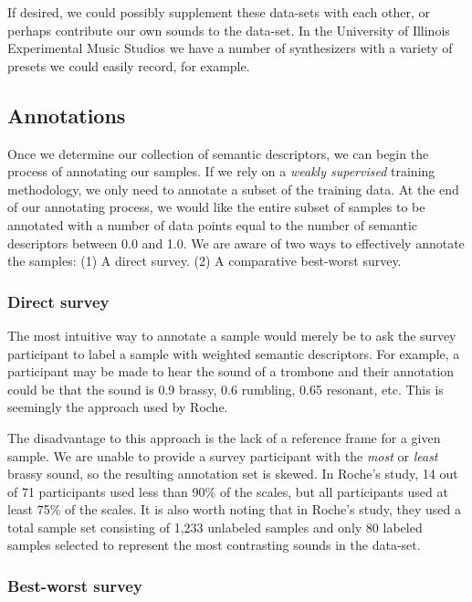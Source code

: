 \documentclass{article}
\begin{document}
If desired, we could possibly supplement these data-sets with each other, or perhaps contribute our own sounds to the data-set. In the University of Illinois Experimental Music Studios we have a number of synthesizers with a variety of presets we could easily record, for example. 

\subsection{Annotations}

Once we determine our collection of semantic descriptors, we can begin the process of annotating our samples. If we rely on a \textit{weakly supervised} training methodology, we only need to annotate a subset of the training data. \cite{Zhou2017} At the end of our annotating process, we would like the entire subset of samples to be annotated with a number of data points equal to the number of semantic descriptors between 0.0 and 1.0. We are aware of two ways to effectively annotate the samples: (1) A direct survey. (2) A comparative best-worst survey.

\subsubsection{Direct survey}

The most intuitive way to annotate a sample would merely be to ask the survey participant to label a sample with weighted semantic descriptors. For example, a participant may be made to hear the sound of a trombone and their annotation could be that the sound is 0.9 brassy, 0.6 rumbling, 0.65 resonant, etc. This is seemingly the approach used by Roche. \cite{Roche2020, Roche2021}

The disadvantage to this approach is the lack of a reference frame for a given sample. We are unable to provide a survey participant with the \textit{most} or \textit{least} brassy sound, so the resulting annotation set is skewed. In Roche's study, 14 out of 71 participants used less than 90\% of the scales, but all participants used at least 75\% of the scales. It is also worth noting that in Roche's study, they used a total sample set consisting of 1,233 unlabeled samples and only 80 labeled samples selected to represent the most contrasting sounds in the data-set. \cite{Roche2020}

\subsubsection{Best-worst survey}
\end{document}
